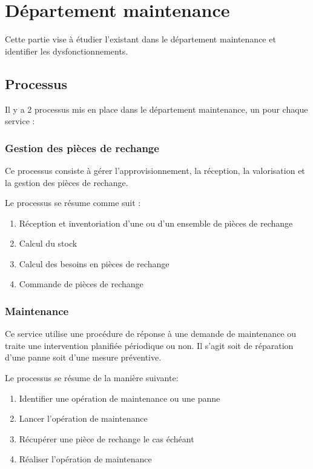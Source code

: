 \documentclass[twoside]{article}
\begin{document}
\vfill
\pagebreak


\section{Département maintenance}

Cette partie vise à étudier l'existant dans le département maintenance et
identifier les dysfonctionnements.

\subsection{Processus}
Il y a 2 processus mis en place dans le département maintenance, un pour 
chaque service :

\subsubsection{Gestion des pièces de rechange}

Ce processus consiste à gérer l'approvisionnement, la réception, la 
valorisation et la gestion des pièces de rechange.

Le processus se résume comme suit :

\begin{enumerate}
\item Réception et inventoriation d'une ou d'un ensemble de pièces de
        rechange
\item Calcul du stock
\item Calcul des besoins en pièces de rechange
\item Commande de pièces de rechange
\end{enumerate}

\subsubsection{Maintenance}
Ce service utilise une procédure de réponse à une demande de maintenance ou
traite une intervention planifiée périodique ou non. Il s'agit soit de 
réparation d'une panne soit d'une mesure préventive.


Le processus se résume de la manière suivante:

\begin{enumerate}
\item Identifier une opération de maintenance ou une panne
\item Lancer l'opération de maintenance
\item Récupérer une pièce de rechange le cas échéant
\item Réaliser l'opération de maintenance
\end{enumerate}
\end{document}
